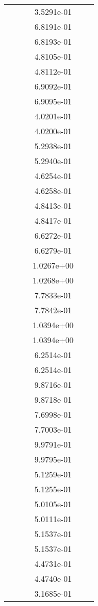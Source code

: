 \begin{xltabular}{\textwidth}{r|rS[table-format=1.3e+2]S[table-format=1.4e+2]S[table-format=1.4e+2]S[table-format=-1.5]}
&  &  & 3.5291e-01 & & \\
&  &  & 6.8191e-01 & & \\
&  &  & 6.8193e-01 & & \\
&  &  & 4.8105e-01 & & \\
&  &  & 4.8112e-01 & & \\
&  &  & 6.9092e-01 & & \\
&  &  & 6.9095e-01 & & \\
&  &  & 4.0201e-01 & & \\
&  &  & 4.0200e-01 & & \\
&  &  & 5.2938e-01 & & \\
&  &  & 5.2940e-01 & & \\
&  &  & 4.6254e-01 & & \\
&  &  & 4.6258e-01 & & \\
&  &  & 4.8413e-01 & & \\
&  &  & 4.8417e-01 & & \\
&  &  & 6.6272e-01 & & \\
&  &  & 6.6279e-01 & & \\
&  &  & 1.0267e+00 & & \\
&  &  & 1.0268e+00 & & \\
&  &  & 7.7833e-01 & & \\
&  &  & 7.7842e-01 & & \\
&  &  & 1.0394e+00 & & \\
&  &  & 1.0394e+00 & & \\
&  &  & 6.2514e-01 & & \\
&  &  & 6.2514e-01 & & \\
&  &  & 9.8716e-01 & & \\
&  &  & 9.8718e-01 & & \\
&  &  & 7.6998e-01 & & \\
&  &  & 7.7003e-01 & & \\
&  &  & 9.9791e-01 & & \\
&  &  & 9.9795e-01 & & \\
&  &  & 5.1259e-01 & & \\
&  &  & 5.1255e-01 & & \\
&  &  & 5.0105e-01 & & \\
&  &  & 5.0111e-01 & & \\
&  &  & 5.1537e-01 & & \\
&  &  & 5.1537e-01 & & \\
&  &  & 4.4731e-01 & & \\
&  &  & 4.4740e-01 & & \\
&  &  & 3.1685e-01 & & \\

\end{xltabular}
